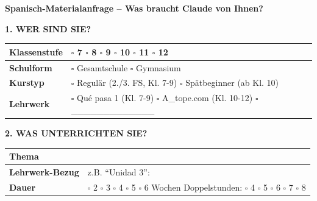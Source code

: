 \documentclass[10pt,a4paper]{article}
\begin{document}
\begin{center}
\colorbox{spanisch}{\parbox{\dimexpr\textwidth-2\fboxsep}{%
\centering\color{white}\Large\bfseries\vspace{3pt}
Spanisch-Materialanfrage -- Was braucht Claude von Ihnen?
\vspace{3pt}}}
\end{center}

\vspace{2mm}

\renewcommand{\arraystretch}{1.3}
\small

\textcolor{spanisch}{\textbf{1. WER SIND SIE?}}
\vspace{1mm}

\begin{tabularx}{\textwidth}{|>{\raggedright\arraybackslash}p{2.8cm}|X|}
\hline
\rowcolor{lightgray}
\textbf{Klassenstufe} & $\square$ 7 \quad $\square$ 8 \quad $\square$ 9 \quad $\square$ 10 \quad $\square$ 11 \quad $\square$ 12 \\
\hline
\textbf{Schulform} & $\square$ Gesamtschule \quad $\square$ Gymnasium \\
\hline
\rowcolor{lightgray}
\textbf{Kurstyp} & $\square$ Regulär (2./3. FS, Kl. 7-9) \quad $\square$ Spätbeginner (ab Kl. 10) \\
\hline
\textbf{Lehrwerk} & $\square$ Qué pasa 1 (Kl. 7-9) \quad $\square$ A\_tope.com (Kl. 10-12) \quad $\square$ \_\_\_\_\_\_\_\_\_\_\_\_\_ \\
\hline
\end{tabularx}

\vspace{3mm}

\textcolor{spanisch}{\textbf{2. WAS UNTERRICHTEN SIE?}}
\vspace{1mm}

\begin{tabularx}{\textwidth}{|>{\raggedright\arraybackslash}p{2.8cm}|X|}
\hline
\rowcolor{lightgray}
\textbf{Thema} & \\
\hline
\textbf{Lehrwerk-Bezug} & z.B. ``Unidad 3'': \\
\hline
\rowcolor{lightgray}
\textbf{Dauer} & $\square$ 2 \quad $\square$ 3 \quad $\square$ 4 \quad $\square$ 5 \quad $\square$ 6 Wochen \hfill Doppelstunden: $\square$ 4 \quad $\square$ 5 \quad $\square$ 6 \quad $\square$ 7 \quad $\square$ 8 \\
\hline
\end{tabularx}

\vspace{3mm}
\end{document}
